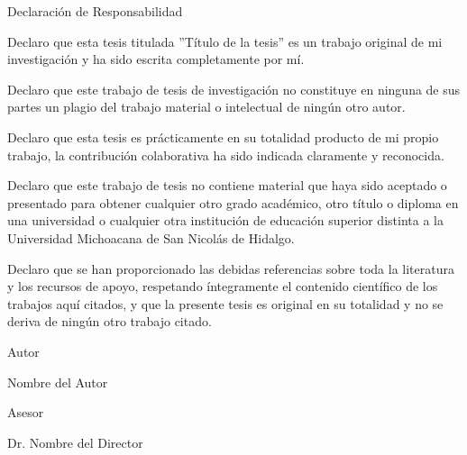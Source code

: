 {\Huge Declaración de Responsabilidad}
\newline
\newline

Declaro que esta tesis titulada ”Título de la tesis” es un trabajo original de mi investigación y ha sido escrita completamente por mí.

Declaro que este trabajo de tesis de investigación no constituye en ninguna de sus partes un plagio del trabajo material o intelectual de ningún otro autor.

Declaro que esta tesis es prácticamente en su totalidad producto de mi propio trabajo, la contribución colaborativa ha sido indicada claramente y reconocida.

Declaro que este trabajo de tesis no contiene material que haya sido aceptado o presentado para obtener cualquier otro grado académico, otro título o diploma en una universidad o cualquier otra institución de educación superior distinta a la Universidad Michoacana de San Nicolás de Hidalgo.

Declaro que se han proporcionado las debidas referencias sobre toda la literatura y los recursos de apoyo, respetando íntegramente el contenido científico de los trabajos aquí citados, y que la presente tesis es original en su totalidad y no se deriva de ningún otro trabajo citado.

\vspace{10mm}

Autor

\vspace{15mm}

Nombre del Autor

\vspace{15mm}

Asesor

\vspace{15mm}

Dr. Nombre del Director
